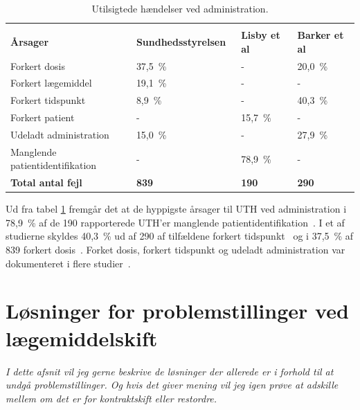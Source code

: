 \vspace{2mm}
\begin{longtable}{p{5.5cm}|p{3.5cm}|p{2cm}|p{2.3cm}}
	\caption{Utilsigtede hændelser ved administration.}
	\vspace{2mm}
	\label{table:UTHAdministration} \\
\cellcolor[HTML]{C0C0C0} {\textbf{Årsager}} & 
{\cellcolor[HTML]{C0C0C0}\textbf{Sundhedsstyrelsen~\citep{Sundhedsstyrelsen2005}}} &
{\cellcolor[HTML]{C0C0C0}\textbf{Lisby et al~\citep{Lisby2005}}} &
{\cellcolor[HTML]{C0C0C0}\textbf{Barker et al~\citep{Barker2002}}} \\ \hline
Forkert dosis & 37,5~\% & - & 20,0~\% \\ \hline
Forkert lægemiddel & 19,1~\% & - & - \\ \hline
Forkert tidspunkt & 8,9~\% & - & 40,3~\% \\ \hline
Forkert patient & - & 15,7~\% &  - \\ \hline
Udeladt administration & 15,0~\% & - & 27,9~\% \\ \hline
Manglende patientidentifikation & - & 78,9~\% & - \\ \hline
\cellcolor[HTML]{C0C0C0} {\textbf{Total antal fejl}} & 
{\cellcolor[HTML]{C0C0C0}\textbf{839}} &
{\cellcolor[HTML]{C0C0C0}\textbf{190}} &
{\cellcolor[HTML]{C0C0C0}\textbf{290}}
\end{longtable}
\vspace{0.25cm}

Ud fra tabel \ref{table:UTHAdministration} fremgår det at de hyppigste årsager til UTH ved administration i 78,9~\% af de 190 rapporterede UTH'er manglende patientidentifikation~\citep{Lisby2005}. I et af studierne skyldes 40,3~\% ud af 290 af tilfældene forkert tidspunkt~\citep{Barker2002} og i 37,5~\% af 839 forkert dosis~\citep{Sundhedsstyrelsen2005}. Forket dosis, forkert tidspunkt og udeladt administration var dokumenteret i flere studier~\citep{Lisby2005,Sundhedsstyrelsen2005,Barker2002}.


\section{Løsninger for problemstillinger ved lægemiddelskift}
\textit{I dette afsnit vil jeg gerne beskrive de løsninger der allerede er i forhold til at undgå problemstillinger. Og hvis det giver mening  vil jeg igen prøve at adskille mellem om det er for kontraktskift eller restordre.}

